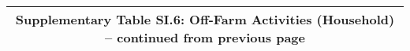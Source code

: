 \begin{longtable}{llcccccccccc}
\multicolumn{12}{c}{{\bfseries Supplementary Table SI.6: Off-Farm Activities (Household) -- continued from previous page}} \\ \hline                                                                                                                                                                                                                                                                                                                                                                                                                                                                                                                                                                                                                                                                                                                                                      

\end{longtable}
